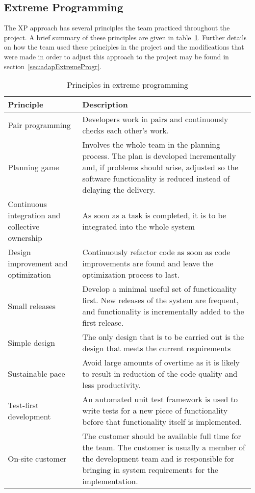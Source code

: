 \subsection{Extreme Programming}
The XP approach has several principles the team practiced throughout the project. A brief summary of these principles are given in table~\ref{tab:exProg}. Further details on how the team used these principles in the project and the modifications that were made in order to adjust this approach to the project may be found in section~\ref{sec:adapExtremeProgr}.

\begin{table}[H]
\begin{tabular}{|p{4cm}|p{11.7cm}|}
\hline
\textbf{Principle} & \textbf{Description} \\\hline
Pair programming & Developers work in pairs and continuously checks each other's work.\\\hline
Planning game & Involves the whole team in the planning process. The plan is developed incrementally and, if problems should arise, adjusted so the software functionality is reduced instead of delaying the delivery.
\\\hline
Continuous integration and collective ownership& As soon as a task is completed, it is to be integrated into the whole system\\\hline
Design improvement and optimization & Continuously refactor code as soon as code improvements are found and leave the optimization process to last. \\\hline
Small releases & Develop a minimal useful set of functionality first. New releases of the system are frequent, and functionality is incrementally added to the first release.\\\hline
Simple design & The only design that is to be carried out is the design that meets the current requirements\\\hline
Sustainable pace & Avoid large amounts of overtime as it is likely to result in reduction of the code quality and less productivity. \\\hline
Test-first development & An automated unit test framework is used to write tests for a new piece of functionality before that functionality itself is implemented. \\\hline
On-site customer & The customer should be available full time for the team. The customer is usually a member of the development team and is responsible for bringing in system requirements for the implementation.\\\hline
\end{tabular}
\caption{Principles in extreme programming}
\label{tab:exProg}
\end{table}
